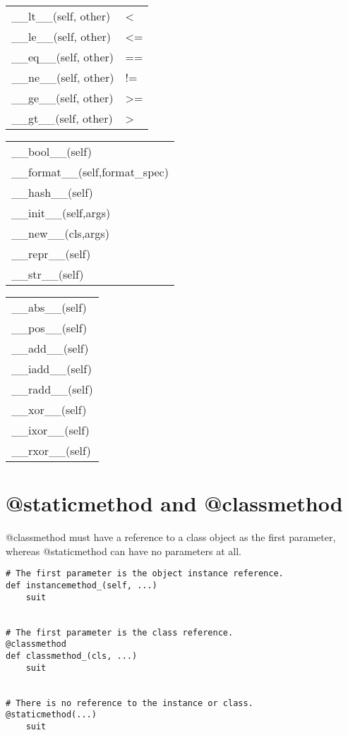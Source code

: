 \documentclass[11pt]{article}
\begin{document}
\begin{center}
\begin{tabular}{ll}
\_\_lt\_\_(self, other) & <\\
\_\_le\_\_(self, other) & <=\\
\_\_eq\_\_(self, other) & ==\\
\_\_ne\_\_(self, other) & !=\\
\_\_ge\_\_(self, other) & >=\\
\_\_gt\_\_(self, other) & >\\
\end{tabular}
\end{center}


\begin{center}
\begin{tabular}{l}
\_\_bool\_\_(self)\\
\_\_format\_\_(self,format\_spec)\\
\_\_hash\_\_(self)\\
\_\_init\_\_(self,args)\\
\_\_new\_\_(cls,args)\\
\_\_repr\_\_(self)\\
\_\_str\_\_(self)\\
\end{tabular}
\end{center}


\begin{center}
\begin{tabular}{l}
\_\_abs\_\_(self)\\
\_\_pos\_\_(self)\\
\_\_add\_\_(self)\\
\_\_iadd\_\_(self)\\
\_\_radd\_\_(self)\\
\_\_xor\_\_(self)\\
\_\_ixor\_\_(self)\\
\_\_rxor\_\_(self)\\
\end{tabular}
\end{center}

\section{@staticmethod and @classmethod}
\label{sec-36}
@classmethod must have a reference to a class object as the first parameter, whereas @staticmethod can have no parameters at all. \\
\begin{verbatim}
# The first parameter is the object instance reference.
def instancemethod_(self, ...)
    suit


# The first parameter is the class reference.
@classmethod
def classmethod_(cls, ...)
    suit


# There is no reference to the instance or class.
@staticmethod(...)
    suit
\end{verbatim}
\end{document}
